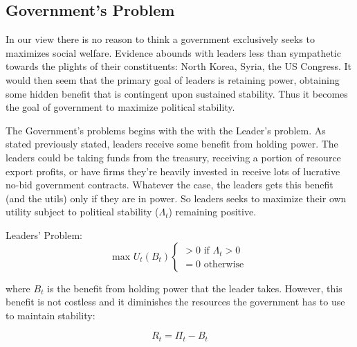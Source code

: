 \documentclass[12pt]{article}
\begin{document}
\begin{spacing}{1.5}



\subsection{Government's Problem} 

In our view there is no reason to think a government exclusively seeks to maximizes social welfare. Evidence abounds with leaders less than sympathetic towards the plights of their constituents: North Korea, Syria, the US Congress. It would then seem that the primary goal of leaders is retaining power, obtaining some hidden benefit that is contingent upon sustained stability. Thus it becomes the goal of government to maximize political stability. 

The Government's problems begins with the with the Leader's problem. As stated previously stated, leaders receive some benefit from holding power. The leaders could be taking funds from the treasury, receiving a portion of resource export profits, or have firms they're heavily invested in receive lots of lucrative no-bid government contracts. Whatever the case, the leaders gets this benefit (and the utils) only if they are in power. So leaders seeks to maximize their own utility subject to political stability ($\Lambda_t$) remaining positive.

\vspace{.5 em}
\noindent Leaders' Problem:
\begin{equation}
	 \text{max } U_t(B_t) \begin{cases}
		>0 \text{ if } \Lambda_t > 0 \\
		= 0 \text{ otherwise} 	
	\end{cases}
\end{equation} 

\noindent where $B_t$ is the benefit from holding power that the leader takes. However, this benefit is not costless and it diminishes the resources the government has to use to maintain stability: 

\vspace{.5 em}
\begin{equation}
	R_t={\Pi}_t-B_t
\end{equation} 


\end{spacing}
\end{document}
